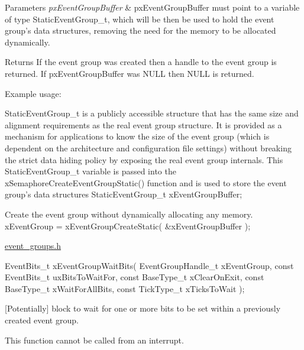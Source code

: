 \begin{DoxyParams}{Parameters}
{\em px\-Event\-Group\-Buffer} & px\-Event\-Group\-Buffer must point to a variable of type Static\-Event\-Group\-\_\-t, which will be then be used to hold the event group's data structures, removing the need for the memory to be allocated dynamically.\\
\hline
\end{DoxyParams}
\begin{DoxyReturn}{Returns}
If the event group was created then a handle to the event group is returned. If px\-Event\-Group\-Buffer was N\-U\-L\-L then N\-U\-L\-L is returned.
\end{DoxyReturn}
Example usage\-: 
\begin{DoxyPre}
StaticEventGroup\_t is a publicly accessible structure that has the same
size and alignment requirements as the real event group structure.  It is
provided as a mechanism for applications to know the size of the event
group (which is dependent on the architecture and configuration file
settings) without breaking the strict data hiding policy by exposing the
real event group internals.  This StaticEventGroup\_t variable is passed
into the xSemaphoreCreateEventGroupStatic() function and is used to store
the event group's data structures
    StaticEventGroup\_t xEventGroupBuffer;\end{DoxyPre}



\begin{DoxyPre}Create the event group without dynamically allocating any memory.
    xEventGroup = xEventGroupCreateStatic( &xEventGroupBuffer );
   \end{DoxyPre}
 \hyperlink{event__groups_8h}{event\-\_\-groups.\-h} 
\begin{DoxyPre}
    EventBits\_t xEventGroupWaitBits(    EventGroupHandle\_t xEventGroup,
                                        const EventBits\_t uxBitsToWaitFor,
                                        const BaseType\_t xClearOnExit,
                                        const BaseType\_t xWaitForAllBits,
                                        const TickType\_t xTicksToWait );
 \end{DoxyPre}


\mbox{[}Potentially\mbox{]} block to wait for one or more bits to be set within a previously created event group.

This function cannot be called from an interrupt.


